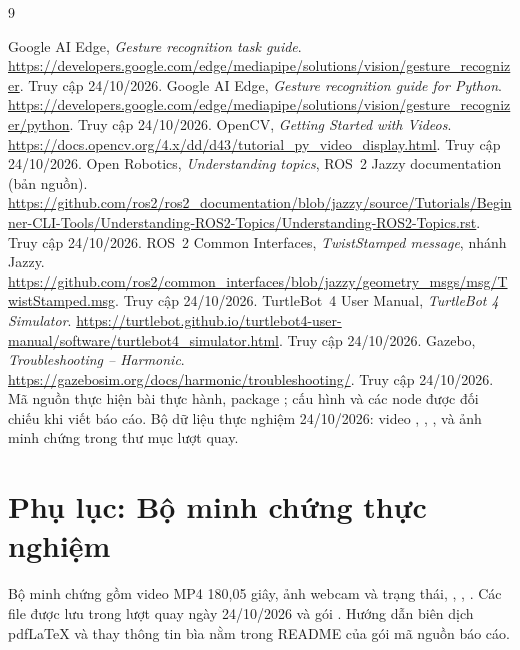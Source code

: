 \documentclass[12pt,a4paper]{article}
\begin{document}
\begin{thebibliography}{9}\small\setlength{\itemsep}{3pt}
 Google AI Edge, \emph{Gesture recognition task guide}. \url{https://developers.google.com/edge/mediapipe/solutions/vision/gesture_recognizer}. Truy cập 24/10/2026.
 Google AI Edge, \emph{Gesture recognition guide for Python}. \url{https://developers.google.com/edge/mediapipe/solutions/vision/gesture_recognizer/python}. Truy cập 24/10/2026.
 OpenCV, \emph{Getting Started with Videos}. \url{https://docs.opencv.org/4.x/dd/d43/tutorial_py_video_display.html}. Truy cập 24/10/2026.
 Open Robotics, \emph{Understanding topics}, ROS~2 Jazzy documentation (bản nguồn). \url{https://github.com/ros2/ros2_documentation/blob/jazzy/source/Tutorials/Beginner-CLI-Tools/Understanding-ROS2-Topics/Understanding-ROS2-Topics.rst}. Truy cập 24/10/2026.
 ROS~2 Common Interfaces, \emph{TwistStamped message}, nhánh Jazzy. \url{https://github.com/ros2/common_interfaces/blob/jazzy/geometry_msgs/msg/TwistStamped.msg}. Truy cập 24/10/2026.
 TurtleBot~4 User Manual, \emph{TurtleBot 4 Simulator}. \url{https://turtlebot.github.io/turtlebot4-user-manual/software/turtlebot4_simulator.html}. Truy cập 24/10/2026.
 Gazebo, \emph{Troubleshooting -- Harmonic}. \url{https://gazebosim.org/docs/harmonic/troubleshooting/}. Truy cập 24/10/2026.
 Mã nguồn thực hiện bài thực hành, package ; cấu hình  và các node được đối chiếu khi viết báo cáo.
 Bộ dữ liệu thực nghiệm 24/10/2026: video , , ,  và ảnh minh chứng trong thư mục lượt quay.
\end{thebibliography}

\appendix
\section*{Phụ lục: Bộ minh chứng thực nghiệm}
Bộ minh chứng gồm video MP4 180,05 giây, ảnh webcam và trạng thái, , , . Các file được lưu trong lượt quay ngày 24/10/2026 và gói . Hướng dẫn biên dịch pdfLaTeX và thay thông tin bìa nằm trong README của gói mã nguồn báo cáo.
\end{document}
